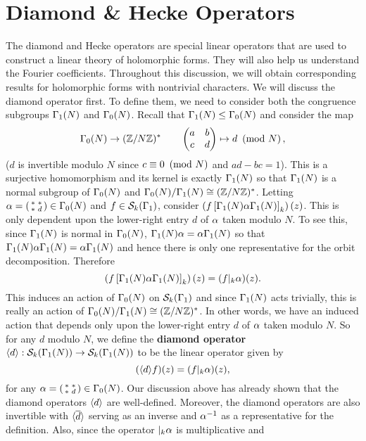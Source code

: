   \section{Diamond \& Hecke Operators}
    The diamond and Hecke operators are special linear operators that are used to construct a linear theory of holomorphic forms. They will also help us understand the Fourier coefficients. Throughout this discussion, we will obtain corresponding results for holomorphic forms with nontrivial characters. We will discuss the diamond operator first. To define them, we need to consider both the congruence subgroups $\Gamma_{1}(N)$ and $\Gamma_{0}(N)$. Recall that $\Gamma_{1}(N) \le \Gamma_{0}(N)$ and consider the map
    \[
      \Gamma_{0}(N) \to (\mathbb{Z}/N\mathbb{Z})^{\ast} \qquad \begin{pmatrix} a & b \\ c & d\end{pmatrix} \mapsto d \ \left(\text{mod }N\right),
    \]
    ($d$ is invertible modulo $N$ since $c \equiv 0 \ \left(\text{mod }N\right)$ and $ad-bc = 1$). This is a surjective homomorphism and its kernel is exactly $\Gamma_{1}(N)$ so that $\Gamma_{1}(N)$ is a normal subgroup of $\Gamma_{0}(N)$ and $\Gamma_{0}(N)/\Gamma_{1}(N) \cong (\mathbb{Z}/N\mathbb{Z})^{\ast}$. Letting $\alpha = \begin{psmallmatrix} \ast & \ast \\ \ast & d \end{psmallmatrix} \in \Gamma_{0}(N)$ and $f \in \mathcal{S}_{k}(\Gamma_{1})$, consider $\left(f\left[\Gamma_{1}(N)\alpha\Gamma_{1}(N)\right]_{k}\right)(z)$. This is only dependent upon the lower-right entry $d$ of $\alpha$ taken modulo $N$. To see this, since $\Gamma_{1}(N)$ is normal in $\Gamma_{0}(N)$, $\Gamma_{1}(N)\alpha = \alpha\Gamma_{1}(N)$ so that $\Gamma_{1}(N)\alpha\Gamma_{1}(N) = \alpha\Gamma_{1}(N)$ and hence there is only one representative for the orbit decomposition. Therefore
    \[
      \left(f\left[\Gamma_{1}(N)\alpha\Gamma_{1}(N)\right]_{k}\right)(z) = (f|_{k}\alpha)(z).
    \]
    This induces an action of $\Gamma_{0}(N)$ on $\mathcal{S}_{k}(\Gamma_{1})$ and since $\Gamma_{1}(N)$ acts trivially, this is really an action of $\Gamma_{0}(N)/\Gamma_{1}(N) \cong (\mathbb{Z}/N\mathbb{Z})^{\ast}$. In other words, we have an induced action that depends only upon the lower-right entry $d$ of $\alpha$ taken modulo $N$. So for any $d$ modulo $N$, we define the \textbf{diamond operator} $\langle d\rangle:\mathcal{S}_{k}(\Gamma_{1}(N)) \to \mathcal{S}_{k}(\Gamma_{1}(N))$ to be the linear operator given by
    \[
      (\langle d\rangle f)(z) = (f|_{k}\alpha)(z),
    \]
    for any $\alpha = \begin{psmallmatrix} \ast & \ast \\ \ast & d \end{psmallmatrix} \in \Gamma_{0}(N)$. Our discussion above has already shown that the diamond operators $\langle d\rangle$ are well-defined. Moreover, the diamond operators are also invertible with $\langle\overline{d}\rangle$ serving as an inverse and $\alpha^{-1}$ as a representative for the definition. Also, since the operator $|_{k}\alpha$ is multiplicative and
